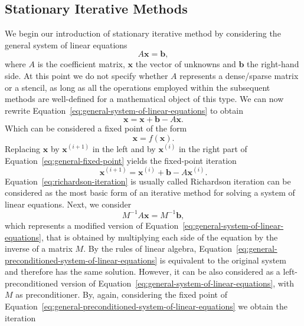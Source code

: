 \subsection{Stationary Iterative Methods} 
We begin our introduction of stationary iterative method by considering the general system of linear equations
\begin{equation}
	A \bm{x} = \bm{b},
	\label{eq:general-system-of-linear-equations}
\end{equation}
where $A$ is the coefficient matrix, $\bm x$ the vector of unknowns and $\bm b$ the right-hand side.
At this point we do not specify whether $A$ represents a dense/sparse matrix or a stencil, as long as all the operations employed within the subsequent methods are well-defined for a mathematical object of this type.
We can now rewrite Equation~\eqref{eq:general-system-of-linear-equations} to obtain
\begin{equation}
	\bm{x} = \bm{x} + \bm b - A \bm{x}.
	\label{eq:general-fixed-point}
\end{equation}
Which can be considered a fixed point of the form
\begin{equation}
	\bm x = f(\bm x).
\end{equation} 
Replacing $\bm x$ by $\bm{x}^{(i+1)}$ in the left and by $\bm{x}^{(i)}$ in the right part of Equation~\eqref{eq:general-fixed-point} yields the fixed-point iteration
\begin{equation}
	\bm{x}^{(i+1)} = \bm{x}^{(i)} + \bm b - A \bm{x}^{(i)}.
	\label{eq:richardson-iteration}
\end{equation}
Equation~\eqref{eq:richardson-iteration} is usually called Richardson iteration can be considered as the most basic form of an iterative method for solving a system of linear equations.
Next, we consider 
\begin{equation}
	M^{-1} A \bm{x} = M^{-1} \bm{b},
	\label{eq:general-preconditioned-system-of-linear-equations}
\end{equation}
which represents a modified version of Equation~\eqref{eq:general-system-of-linear-equations}, that is obtained by multiplying each side of the equation by the inverse of a matrix $M$.
By the rules of linear algebra, Equation~\eqref{eq:general-preconditioned-system-of-linear-equations} is equivalent to the original system and therefore has the same solution.
However, it can be also considered as a left-preconditioned version of Equation~\eqref{eq:general-system-of-linear-equations}, with $M$ as preconditioner.
By, again, considering the fixed point of Equation~\eqref{eq:general-preconditioned-system-of-linear-equations} we obtain the iteration
